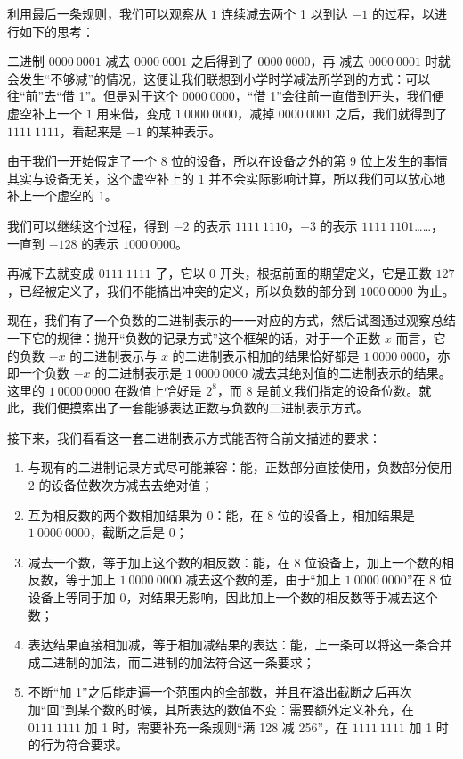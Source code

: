         利用最后一条规则，我们可以观察从 $1$ 连续减去两个 1 以到达 $-1$ 的过程，以进行如下的思考：

        二进制 $0000\ 0001$ 减去 $0000\ 0001$ 之后得到了 $0000\ 0000$，再 减去 $0000\ 0001$ 时就会发生“不够减”的情况，这便让我们联想到小学时学减法所学到的方式：可以往“前”去“借 1”。但是对于这个 $0000\ 0000$，“借 1”会往前一直借到开头，我们便虚空补上一个 $1$ 用来借，变成 $1\ 0000\ 0000$，减掉 $0000\ 0001$ 之后，我们就得到了 $1111\ 1111$，看起来是 $-1$ 的某种表示。
        \begin{displayquote}
            由于我们一开始假定了一个 8 位的设备，所以在设备之外的第 9 位上发生的事情其实与设备无关，这个虚空补上的 $1$ 并不会实际影响计算，所以我们可以放心地补上一个虚空的 $1$。
        \end{displayquote}

        我们可以继续这个过程，得到 $-2$ 的表示 $1111\ 1110$，$-3$ 的表示 $1111\ 1101$……，一直到 $-128$ 的表示 $1000\ 0000$。
        \begin{displayquote}
            再减下去就变成 $0111\ 1111$ 了，它以 $0$ 开头，根据前面的期望定义，它是正数 $127$，已经被定义了，我们不能搞出冲突的定义，所以负数的部分到 $1000\ 0000$ 为止。
        \end{displayquote}

        现在，我们有了一个负数的二进制表示的一一对应的方式，然后试图通过观察总结一下它的规律：抛开“负数的记录方式”这个框架的话，对于一个正数 $x$ 而言，它的负数 $-x$ 的二进制表示与 $x$ 的二进制表示相加的结果恰好都是 $1\ 0000\ 0000$，亦即一个负数 $-x$ 的二进制表示是 $1\ 0000\ 0000$ 减去其绝对值的二进制表示的结果。这里的 $1\ 0000\ 0000$ 在数值上恰好是 $2 ^ 8$，而 $8$ 是前文我们指定的设备位数。就此，我们便摸索出了一套能够表达正数与负数的二进制表示方式。

        接下来，我们看看这一套二进制表示方式能否符合前文描述的要求：
        \begin{enumerate}
            \item 与现有的二进制记录方式尽可能兼容：能，正数部分直接使用，负数部分使用 $2$ 的设备位数次方减去去绝对值；
            \item 互为相反数的两个数相加结果为 $0$：能，在 8 位的设备上，相加结果是 $1\ 0000\ 0000$，截断之后是 $0$；
            \item 减去一个数，等于加上这个数的相反数：能，在 8 位设备上，加上一个数的相反数，等于加上 $1\ 0000\ 0000$ 减去这个数的差，由于“加上 $1\ 0000\ 0000$”在 8 位设备上等同于加 $0$，对结果无影响，因此加上一个数的相反数等于减去这个数；
            \item 表达结果直接相加减，等于相加减结果的表达：能，上一条可以将这一条合并成二进制的加法，而二进制的加法符合这一条要求；
            \item 不断“加 1”之后能走遍一个范围内的全部数，并且在溢出截断之后再次加“回”到某个数的时候，其所表达的数值不变：需要额外定义补充，在 $0111\ 1111$ 加 1 时，需要补充一条规则“满 128 减 256”，在 $1111\ 1111$ 加 1 时的行为符合要求。
        \end{enumerate}

